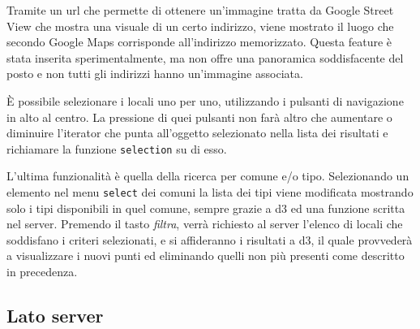 Tramite un url che permette di ottenere un'immagine tratta da Google Street View che mostra una visuale di un certo indirizzo, viene mostrato il luogo che secondo Google Maps corrisponde all'indirizzo memorizzato. Questa feature è stata inserita sperimentalmente, ma non offre una panoramica soddisfacente del posto e non tutti gli indirizzi hanno un'immagine associata.

\`E possibile selezionare i locali uno per uno, utilizzando i pulsanti di navigazione in alto al centro. La pressione di quei pulsanti non farà altro che aumentare o diminuire l'iterator che punta all'oggetto selezionato nella lista dei risultati e richiamare la funzione \texttt{selection} su di esso.

L'ultima funzionalità è quella della ricerca per comune e/o tipo. Selezionando un elemento nel menu \texttt{select} dei comuni la lista dei tipi viene modificata mostrando solo i tipi disponibili in quel comune, sempre grazie a d3 ed una funzione scritta nel server. Premendo il tasto \emph{filtra}, verrà richiesto al server l'elenco di locali che soddisfano i criteri selezionati, e si affideranno i risultati a d3, il quale provvederà a visualizzare i nuovi punti ed eliminando quelli non più presenti come descritto in precedenza.

\subsection{Lato server}






